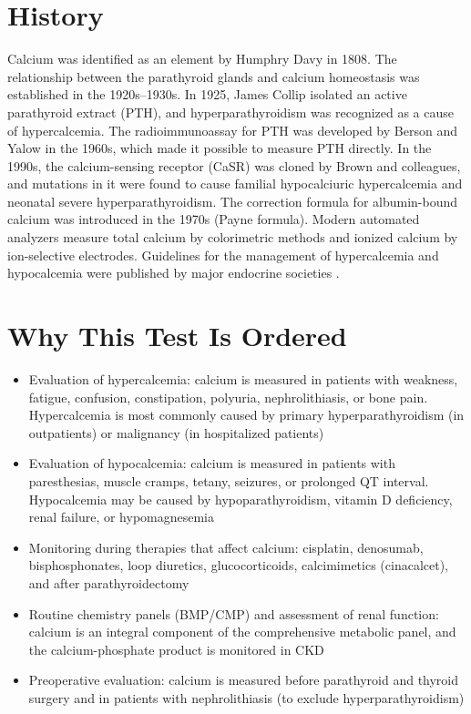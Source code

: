 \section*{History}
Calcium was identified as an element by Humphry Davy in 1808. The relationship between the parathyroid glands and calcium homeostasis was established in the 1920s--1930s. In 1925, James Collip isolated an active parathyroid extract (PTH), and hyperparathyroidism was recognized as a cause of hypercalcemia. The radioimmunoassay for PTH was developed by Berson and Yalow in the 1960s, which made it possible to measure PTH directly. In the 1990s, the calcium-sensing receptor (CaSR) was cloned by Brown and colleagues, and mutations in it were found to cause familial hypocalciuric hypercalcemia and neonatal severe hyperparathyroidism. The correction formula for albumin-bound calcium was introduced in the 1970s (Payne formula). Modern automated analyzers measure total calcium by colorimetric methods and ionized calcium by ion-selective electrodes. Guidelines for the management of hypercalcemia and hypocalcemia were published by major endocrine societies \cite{bilezikian2018}\cite{cooper2008}\cite{stewart2005}.

\section*{Why This Test Is Ordered}
\begin{itemize}
  \item Evaluation of hypercalcemia: calcium is measured in patients with weakness, fatigue, confusion, constipation, polyuria, nephrolithiasis, or bone pain. Hypercalcemia is most commonly caused by primary hyperparathyroidism (in outpatients) or malignancy (in hospitalized patients)
  \item Evaluation of hypocalcemia: calcium is measured in patients with paresthesias, muscle cramps, tetany, seizures, or prolonged QT interval. Hypocalcemia may be caused by hypoparathyroidism, vitamin D deficiency, renal failure, or hypomagnesemia
  \item Monitoring during therapies that affect calcium: cisplatin, denosumab, bisphosphonates, loop diuretics, glucocorticoids, calcimimetics (cinacalcet), and after parathyroidectomy
  \item Routine chemistry panels (BMP/CMP) and assessment of renal function: calcium is an integral component of the comprehensive metabolic panel, and the calcium-phosphate product is monitored in CKD
  \item Preoperative evaluation: calcium is measured before parathyroid and thyroid surgery and in patients with nephrolithiasis (to exclude hyperparathyroidism)
\end{itemize}

